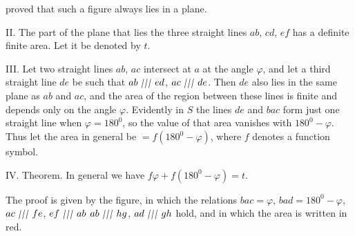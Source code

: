 %
proved that such a figure always lies in a plane.
\begin{center}\end{center}
II. The part of the plane that lies  the three straight lines $ab$, $cd$, $ef$ has a definite finite area. Let it be denoted by $t$.

III. Let two straight lines $ab$, $ac$ intersect at $a$ at the angle $\varphi$, and let a third straight line $de$ be such that $ab\TripleParallel ed$, $ac\TripleParallel de$. Then $de$ also lies in the same plane as $ab$ and $ac$, and the area of the region between these lines is finite and depends only on the angle $\varphi$. Evidently in $S$ the lines $de$ and $bac$ form just one straight line when $\varphi=180^{0}$, so the value of that area vanishes with $180^{0}-\varphi$. Thus let the area in general be $=f(180^{0}-\varphi)$, where $f$ denotes a function symbol.
\begin{center}\end{center}

IV. Theorem. In general we have $f\varphi+f(180^{0}-\varphi)=t$.
\begin{center}\end{center}
The proof is given by the figure, in which the relations $bac=\varphi$, $bad=180^{0}-\varphi$, $ac\TripleParallel fe$, $ef\TripleParallel ab$ $ab\TripleParallel hg$, $ad\TripleParallel gh$ hold, and in which the area is written in red.

